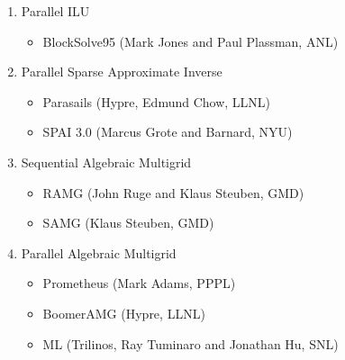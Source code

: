 \begin{frame}
{\begin{enumerate}
  \item Parallel ILU
  \begin{itemize}
    \item BlockSolve95 (Mark Jones and Paul Plassman, ANL)
  \end{itemize}

  \item Parallel Sparse Approximate Inverse
  \begin{itemize}
    \item Parasails (Hypre, Edmund Chow, LLNL)
    \item SPAI 3.0 (Marcus Grote and Barnard, NYU)
  \end{itemize}

  \item Sequential Algebraic Multigrid
  \begin{itemize}
    \item RAMG (John Ruge and Klaus Steuben, GMD)
    \item SAMG (Klaus Steuben, GMD)
  \end{itemize}

  \item Parallel Algebraic Multigrid
  \begin{itemize}
    \item Prometheus (Mark Adams, PPPL)
    \item BoomerAMG (Hypre, LLNL)
    \item ML (Trilinos, Ray Tuminaro and Jonathan Hu, SNL)
  \end{itemize}
\end{enumerate}
}
\end{frame}
